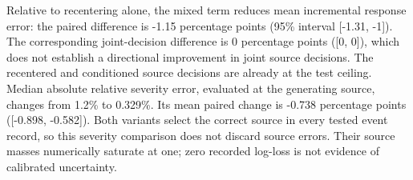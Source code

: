 Relative to recentering alone, the mixed term reduces mean incremental response error: the paired difference is -1.15 percentage points (95\% interval [-1.31, -1]). The corresponding joint-decision difference is 0 percentage points ([0, 0]), which does not establish a directional improvement in joint source decisions. The recentered and conditioned source decisions are already at the test ceiling. Median absolute relative severity error, evaluated at the generating source, changes from 1.2\% to 0.329\%. Its mean paired change is -0.738 percentage points ([-0.898, -0.582]). Both variants select the correct source in every tested event record, so this severity comparison does not discard source errors. Their source masses numerically saturate at one; zero recorded log-loss is not evidence of calibrated uncertainty.
